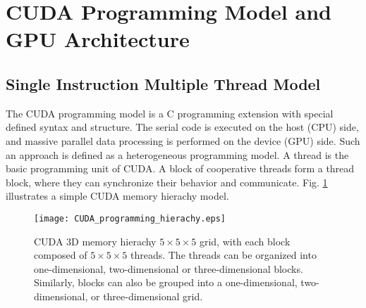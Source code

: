 \documentclass[letterpaper, 10pt, conference]{ieeeconf}
\begin{document}
%

\section{CUDA Programming Model and GPU Architecture} \label{programming model} 
\subsection{Single Instruction Multiple Thread Model}
The CUDA programming model is a C programming extension with special defined syntax and structure. The serial code is executed on the host (CPU) side, and massive parallel data processing is performed on the device (GPU) side. Such an approach is defined as a heterogeneous programming model. A thread is the basic programming unit of CUDA. A block of cooperative threads form a thread block, where they can synchronize their behavior and communicate. Fig. \ref{figure1} illustrates a simple CUDA memory hierachy model.
\begin{figure}[htb]
\centering
\texttt{[image: CUDA\_programming\_hierachy.eps]}
\caption{ CUDA 3D memory hierachy $5\times 5\times 5$ grid, with each block composed of $5\times 5\times 5$ threads.
The threads can be organized into one-dimensional, two-dimensional or three-dimensional blocks. Similarly, blocks can also be grouped into a one-dimensional, two-dimensional, or three-dimensional grid.
}
\label{figure1}
\end{figure} 
\end{document}
